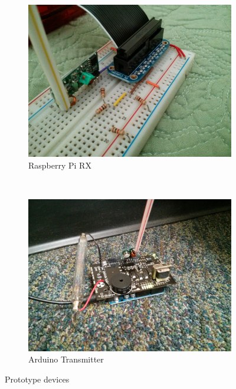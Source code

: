 \documentclass[10pt]{article}
\begin{document}
\begin{figure}
	\centering
	\begin{subfigure}[b]{0.3\textwidth}
		\includegraphics[width=\textwidth]{RaspberryPiRX.jpg}
		\caption{Raspberry Pi RX }
		\label{fig:pirx}
	\end{subfigure}%
	~ %
	\begin{subfigure}[b]{0.3\textwidth}
		\includegraphics[width=\textwidth]{TransmitterArduinoCarpet.jpg}
		\caption{Arduino Transmitter}
		\label{fig:arduinotx}
	\end{subfigure}
	
	\caption{Prototype devices}\label{fig:txrx}
\end{figure}
\end{document}
